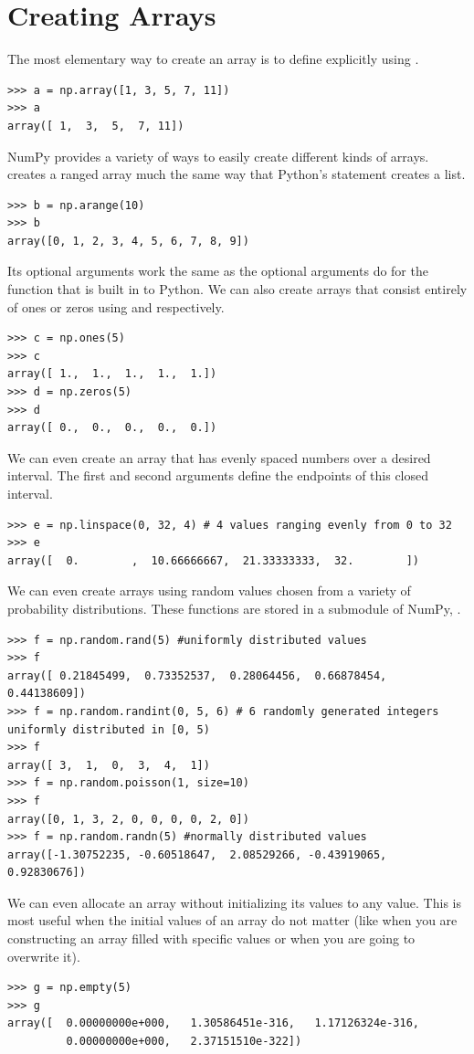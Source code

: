 \section*{Creating Arrays}
The most elementary way to create an array is to define explicitly using .
\begin{lstlisting}
>>> a = np.array([1, 3, 5, 7, 11])
>>> a
array([ 1,  3,  5,  7, 11])
\end{lstlisting}
NumPy provides a variety of ways to easily create different kinds of arrays.
 creates a ranged array much the same way that Python's  statement creates a list.
\begin{lstlisting}
>>> b = np.arange(10)
>>> b
array([0, 1, 2, 3, 4, 5, 6, 7, 8, 9])
\end{lstlisting}
Its optional arguments work the same as the optional arguments do for the  function that is built in to Python.
We can also create arrays that consist entirely of ones or zeros using  and  respectively.
\begin{lstlisting}
>>> c = np.ones(5)
>>> c
array([ 1.,  1.,  1.,  1.,  1.])
>>> d = np.zeros(5)
>>> d
array([ 0.,  0.,  0.,  0.,  0.])
\end{lstlisting}
We can even create an array that has evenly spaced numbers over a desired interval.
The first and second arguments define the endpoints of this closed interval.
\begin{lstlisting}
>>> e = np.linspace(0, 32, 4) # 4 values ranging evenly from 0 to 32
>>> e
array([  0.        ,  10.66666667,  21.33333333,  32.        ])
\end{lstlisting}
We can even create arrays using random values chosen from a variety of probability distributions.
These functions are stored in a submodule of NumPy, .
\begin{lstlisting}
>>> f = np.random.rand(5) #uniformly distributed values
>>> f
array([ 0.21845499,  0.73352537,  0.28064456,  0.66878454,  0.44138609])
>>> f = np.random.randint(0, 5, 6) # 6 randomly generated integers uniformly distributed in [0, 5)
>>> f
array([ 3,  1,  0,  3,  4,  1])
>>> f = np.random.poisson(1, size=10)
>>> f
array([0, 1, 3, 2, 0, 0, 0, 0, 2, 0])
>>> f = np.random.randn(5) #normally distributed values
array([-1.30752235, -0.60518647,  2.08529266, -0.43919065,  0.92830676])
\end{lstlisting}
We can even allocate an array without initializing its values to any value.
This is most useful when the initial values of an array do not matter (like when you are constructing an array filled with specific values or when you are going to overwrite it).
\begin{lstlisting}
>>> g = np.empty(5)
>>> g
array([  0.00000000e+000,   1.30586451e-316,   1.17126324e-316,
         0.00000000e+000,   2.37151510e-322])
\end{lstlisting}

